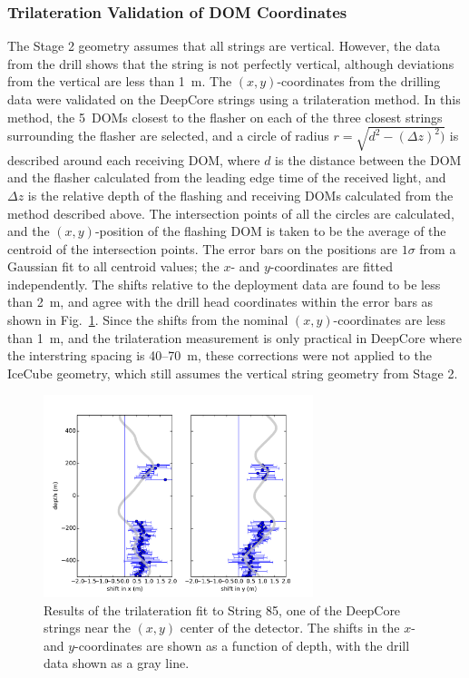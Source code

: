 \subsubsection{\label{sec:trilateration}Trilateration Validation of DOM Coordinates}

The Stage 2 geometry assumes that all strings are vertical. However, the
data from the drill shows that the string is not perfectly vertical,
although deviations from the vertical are less than 1~m. The
$(x,y)$-coordinates from the drilling data were validated on the DeepCore strings
using a trilateration method. In this method, the 5~DOMs closest to the
flasher on each of the three closest strings surrounding the flasher are
selected, and a circle of radius $r = \sqrt{d^2 - (\Delta z)^2)}$ is
described around each receiving DOM, where $d$ is the distance between the DOM
and the flasher calculated from the leading edge time of the received
light, and $\Delta z$ is the relative depth of the flashing and receiving
DOMs calculated from the method described above. The intersection points of
all the circles are calculated, and the $(x,y)$-position of the flashing DOM
is taken to be the average of the centroid of the intersection points. The
error bars on the positions are $1 \sigma$ from a Gaussian fit to all
centroid values; the $x$- and $y$-coordinates are fitted independently. The
shifts relative to the deployment data are found to be less than 2~m, and
agree with the drill head coordinates within the error bars as shown in
Fig.~\ref{fig:trilateration}. Since the shifts from the nominal
$(x,y)$-coordinates are less than 1~m, and the trilateration measurement is only
practical in DeepCore where the interstring spacing is 40--70~m, these
corrections were not applied to the IceCube geometry, which still assumes
the vertical string geometry from Stage 2.

\begin{figure}[!ht]
 \centering
 \includegraphics[width=0.7\textwidth]{graphics/geometry/newtrilat85.pdf}
\caption{Results of the trilateration fit to String 85, one of the DeepCore
  strings near the $(x,y)$ center of the detector. The shifts in the
  $x$- and $y$-coordinates are shown as a function of depth, with the drill data
  shown as a gray line.}
\label{fig:trilateration}
\end{figure}

